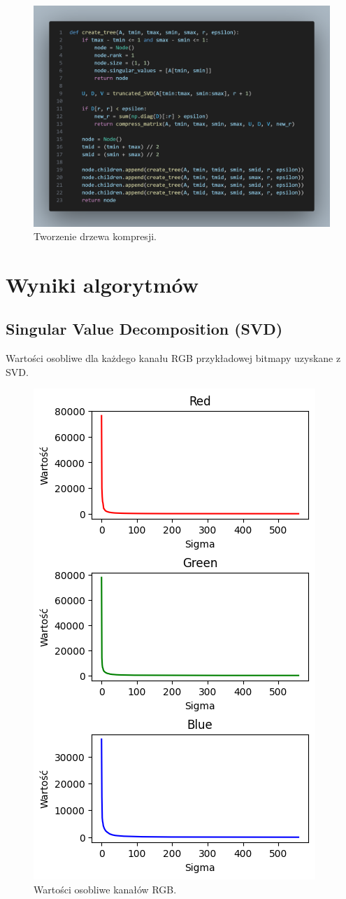 \documentclass[11pt, leqno]{scrartcl}
\begin{document}
    \begin{figure}[H]
        \centering
        \includegraphics[width=1\linewidth]{create_tree.png}
        \caption{Tworzenie drzewa kompresji.}
    \end{figure}

    \section{Wyniki algorytmów}
    \subsection{Singular Value Decomposition (SVD)}
    Wartości osobliwe dla każdego kanału RGB przykładowej bitmapy
    uzyskane z SVD.
    \begin{figure}[H]
        \centering
        \includegraphics[width=0.6\linewidth]{SVD_values.png}
        \caption{Wartości osobliwe kanałów RGB.}
    \end{figure}
\end{document}
